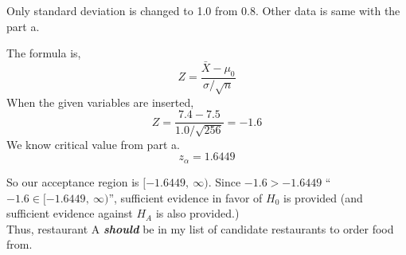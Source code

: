 Only standard deviation is changed to 1.0 from 0.8. Other data is same with the part a.

The formula is,
\begin{equation*}
  Z = \frac{\bar{X} - \mu_0}{\sigma / \sqrt{n}}
\end{equation*}
When the given variables are inserted,
\begin{equation*}
  Z = \frac{7.4 - 7.5}{1.0 / \sqrt{256}} = -1.6
\end{equation*}
We know critical value from part a.
\begin{equation*}
  z_{\alpha} = 1.6449
\end{equation*}

So our acceptance region is $[-1.6449,\ \infty)$. Since $-1.6 > -1.6449$ ``$-1.6 \in [-1.6449,\ \infty)$'', sufficient evidence in favor of $H_0$ is provided (and sufficient evidence against $H_A$ is also provided.)\\

Thus, restaurant A \textbf{\textit{should}} be in my list of candidate restaurants to order food from.
